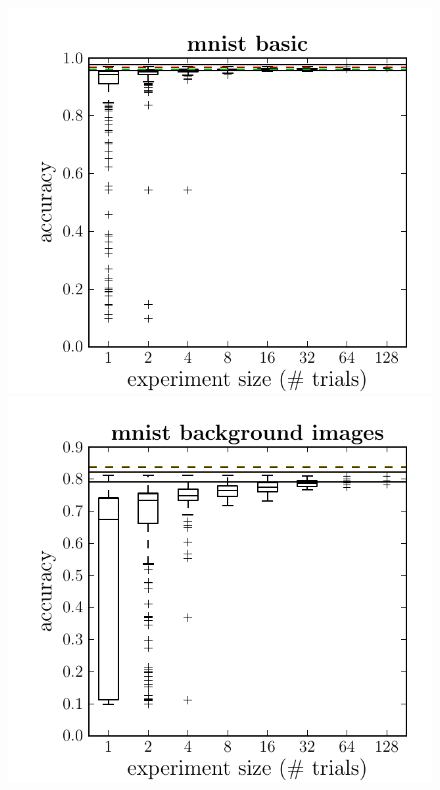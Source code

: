 \documentclass{article}
\newcommand{\vs}[1]{\vspace*{-#1mm}}
\begin{document}
\begin{figure}
\vs{2}
\centering
\begin{minipage}{0.9\linewidth}
    \centering
    \includegraphics[scale=0.37]{figures/dbn_efficiency/dbn_efficiency_mnist_basic}
    \includegraphics[scale=0.37]{figures/dbn_efficiency/dbn_efficiency_mnist_background_images}

\end{minipage}
\end{figure}
\end{document}
